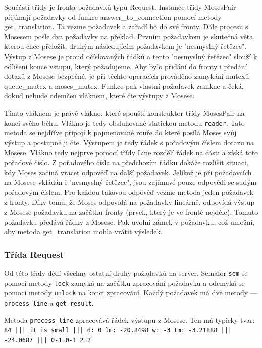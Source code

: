 \documentclass[12pt,a4paper]{report}
\begin{document}
Součástí třídy je fronta požadavků typu Request. Instance třídy MosesPair přijímají požadavky od funkce answer\_to\_connection pomocí metody get\_translation. Ta vezme požadavek a zařadí ho do své fronty. Dále procesu s Mosesem pošle dva požadavky na překlad. Prvním požadavkem je skutečná věta, kterou chce přeložit, druhým následujícím požadavkem je "nesmyslný řetězec". Výstup z Mosese je proud očíslovaných řádků a tento "nesmyslný řetězec" slouží k odlišení konce vstupu, který požadujeme. Aby bylo přidání do fronty i předání dotazů z Mosese bezpečné, je při těchto operacích prováděno zamykání mutexů queue\_mutex a moses\_mutex. Funkce pak vlastní požadavek zamkne a čeká, dokud nebude odemčen vláknem, které čte výstupy z Mosese.

Tímto vláknem je právě vlákno, které spouští konstruktor třídy MosesPair na konci svého běhu. Vlákno je tedy obsluhované statickou metodu {\tt reader}. Tato metoda se nejdříve připojí k pojmenované rouře do které posílá Moses svůj výstup a postupně ji čte. Výstupem je tedy řádek s pořadovým číslem dotazu na Mosese. Vlákno tedy nejprve pomocí třídy Line rozdělí řádek na části a získá toto pořadové číslo. Z pořadového čísla na předchozím řádku dokáže rozlišit situaci, kdy Moses začíná vracet odpověď na další požadavek. Jelikož je při požadavcích na Mosese vkládán i "nesmyslný řetězec", jsou zajímavé pouze odpovědi se sudým pořadovým číslem. Pro každou takovou odpověď vezme metoda jeden požadavek z fronty. Díky tomu, že Moses odpovídá na požadavky lineárně, odpovídá výstup z Mosese požadavku na začátku fronty (prvek, který je ve frontě nejdéle). Tomuto požadavku předává řádky z Mosese. Pak uvolní zámek v požadavku, což umožní, aby metoda get\_translation mohla vrátit výsledek.

\subsubsection{Třída Request}
Od této třídy dědí všechny ostatní druhy požadavků na server. Semafor {\tt sem} se pomocí metody {\tt lock} zamyká na začátku zpracování požadavku a odemyká se pomocí metody {\tt unlock} na konci zpracování. Každý požadavek má dvě metody --- {\tt process\_line} a {\tt get\_result}.

Metoda {\tt process\_line} zpracovává řádek výstupu z Mosese. Ten má typicky tvar: \\

{\tt 84 ||| it is small  ||| d: 0 lm: -20.8498 w: -3 tm: -3.21888 ||| -24.0687 ||| 0-1=0-1 2=2 } \\
\end{document}
